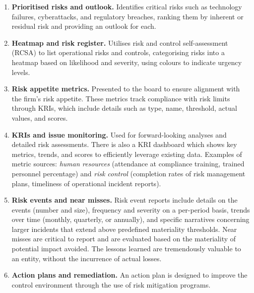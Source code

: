 \begin{enumerate}
\item[\textcolor{rust}{\sffamily\bfseries 1)}] \textbf{Prioritised risks and
outlook.} Identifies critical risks such as technology failures, cyberattacks, and
regulatory breaches, ranking them by inherent or residual risk and providing an
outlook for each.
\item[\textcolor{rust}{\sffamily\bfseries 2)}] \textbf{Heatmap and risk register.}
Utilises risk and control self-assessment (RCSA) to list operational risks and
controls, categorising risks into a heatmap based on likelihood and severity,
using colours to indicate urgency levels.
\item[\textcolor{rust}{\sffamily\bfseries 3)}] \textbf{Risk appetite metrics.}
Presented to the board to ensure alignment with the firm's risk appetite. These
metrics track compliance with risk limits through KRIs, which include details such
as type, name, threshold, actual values, and scores.
\item[\textcolor{rust}{\sffamily\bfseries 4)}] \textbf{KRIs and issue monitoring.}
Used for forward-looking analyses and detailed risk assessments. There is also a
KRI dashboard which shows key metrics, trends, and scores to efficiently leverage
existing data. Examples of metric sources: \emph{human resources} (attendance at
compliance training, trained personnel percentage) and \emph{risk control}
(completion rates of risk management plans, timeliness of operational incident
reports).
\item[\textcolor{rust}{\sffamily\bfseries 5)}] \textbf{Risk events and near
misses.} Risk event reports include details on the events (number and size),
frequency and severity on a per-period basis, trends over time (monthly,
quarterly, or annually), and specific narratives concerning larger incidents that
extend above predefined materiality thresholds. Near misses are critical to report
and are evaluated based on the materiality of potential impact avoided. The
lessons learned are tremendously valuable to an entity, without the incurrence of
actual losses.
\item[\textcolor{rust}{\sffamily\bfseries 6)}] \textbf{Action plans and
remediation.} An action plan is designed to improve the control environment
through the use of risk mitigation programs.
\end{enumerate}
